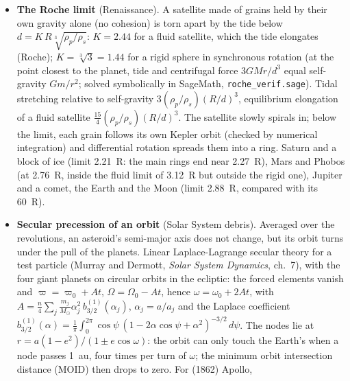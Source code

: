 \begin{itemize}
eccentricity over time, resonances $a=a_J(q/p)^{2/3}$ (Kirkwood gaps 3:1, 5:2, 7:3, 2:1). The distance between the
twins, on a logarithmic scale, grows slowly on a regular orbit and exponentially when the asteroid skims past Jupiter
(comet): that is chaos. Real Jupiter or ten times heavier; rotating or fixed frame. Checked by an independent
integration in SageMath (\texttt{resonances\_verif.sage}, DOP853 at $10^{-13}$): same positions to $10^{-9}$.
\item \textbf{The Roche limit} (Renaissance). A satellite made of grains held by their own gravity alone (no cohesion)
is torn apart by the tide below $d=K\,R\sqrt[3]{\rho_p/\rho_s}$: $K=2.44$ for a fluid satellite, which the tide elongates
(Roche); $K=\sqrt[3]3=1.44$ for a rigid sphere in synchronous rotation (at the point closest to the planet, tide and
centrifugal force $3GMr/d^3$ equal self-gravity $Gm/r^2$; solved symbolically in SageMath, \texttt{roche\_verif.sage}).
Tidal stretching relative to self-gravity $3(\rho_p/\rho_s)(R/d)^3$, equilibrium elongation of a fluid satellite
$\tfrac{15}{4}(\rho_p/\rho_s)(R/d)^3$. The satellite slowly spirals in; below the limit, each grain follows its own Kepler
orbit (checked by numerical integration) and differential rotation spreads them into a ring. Saturn and a block of ice
(limit 2.21~R: the main rings end near 2.27~R), Mars and Phobos (at 2.76~R, inside the fluid limit of 3.12~R but
outside the rigid one), Jupiter and a comet, the Earth and the Moon (limit 2.88~R, compared with its 60~R).
\item \textbf{Secular precession of an orbit} (Solar System debris). Averaged over the revolutions, an asteroid's
semi-major axis does not change, but its orbit turns under the pull of the planets. Linear Laplace-Lagrange secular
theory for a test particle (Murray and Dermott, \emph{Solar System Dynamics}, ch.~7), with the four giant planets on
circular orbits in the ecliptic: the forced elements vanish and $\varpi=\varpi_0+At$, $\Omega=\Omega_0-At$, hence
$\omega=\omega_0+2At$, with $A=\frac n4\sum_j\frac{m_j}{M_\odot}\alpha_j^2\,b^{(1)}_{3/2}(\alpha_j)$, $\alpha_j=a/a_j$ and
the Laplace coefficient $b^{(1)}_{3/2}(\alpha)=\frac1\pi\int_0^{2\pi}\cos\psi\,(1-2\alpha\cos\psi+\alpha^2)^{-3/2}\,d\psi$.
The nodes lie at $r=a(1-e^2)/(1\pm e\cos\omega)$: the orbit can only touch the Earth's when a node passes 1~au, four
times per turn of $\omega$; the minimum orbit intersection distance (MOID) then drops to zero. For (1862) Apollo,

\end{itemize}
